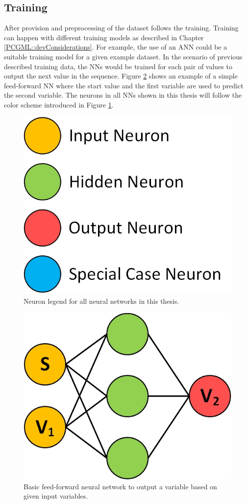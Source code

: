 \documentclass[MGS,Master,english]{twbook}%
\begin{document}
\subsection{Training}
After provision and preprocessing of the dataset follows the training. Training can happen with different training models as described in Chapter \ref{PCGML::devConsiderations}. For example, the use of an ANN could be a suitable training model for a given example dataset. In the scenario of previous described training data, the \acp{NN} would be trained for each pair of values to output the next value in the sequence. Figure \ref{fig::PCGML::devExample::NNbasic} shows an example of a simple feed-forward \ac{NN} where the start value and the first variable are used to predict the second variable. The neurons in all \acp{NN} shown in this thesis will follow the color scheme introduced in Figure \ref{fig::neuron_legend}. 
\begin{figure}[!htbp]
	\centering
	\includegraphics[width=0.3\linewidth]{PICs/NNs/neurons_legend.jpg}
	\caption{Neuron legend for all neural networks in this thesis.}\label{fig::neuron_legend}
\end{figure}
\begin{figure}[!htbp]
	\centering
	\includegraphics[width=0.3\linewidth]{PICs/NNs/PCGML_development_example_NN_basic}
	\caption{Basic feed-forward neural network to output a variable based on given input variables.}\label{fig::PCGML::devExample::NNbasic}
\end{figure}
\end{document}
